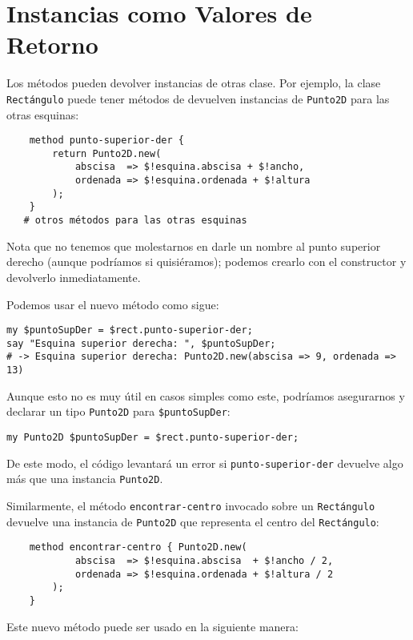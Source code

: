 \section{Instancias como Valores de Retorno}

Los métodos pueden devolver instancias de otras clase. 
Por ejemplo, la clase {\tt Rectángulo} puede tener métodos
de devuelven instancias de {\tt Punto2D} para las otras
esquinas:

\begin{verbatim}
    method punto-superior-der {
        return Punto2D.new(
            abscisa  => $!esquina.abscisa + $!ancho, 
            ordenada => $!esquina.ordenada + $!altura
        );
    }
   # otros métodos para las otras esquinas
\end{verbatim}

Nota que no tenemos que molestarnos en darle un nombre al
punto superior derecho (aunque podríamos si quisiéramos);
podemos crearlo con el constructor y devolverlo inmediatamente.

Podemos usar el nuevo método como sigue:

\begin{verbatim}
my $puntoSupDer = $rect.punto-superior-der;
say "Esquina superior derecha: ", $puntoSupDer;
# -> Esquina superior derecha: Punto2D.new(abscisa => 9, ordenada => 13)
\end{verbatim}

Aunque esto no es muy útil en casos simples como este, 
podríamos asegurarnos y declarar un tipo {\tt Punto2D}
para \verb|$puntoSupDer|:

\begin{verbatim}
my Punto2D $puntoSupDer = $rect.punto-superior-der;
\end{verbatim} 

De este modo, el código levantará un error si {\tt punto-superior-der}
devuelve algo más que una instancia {\tt Punto2D}.

Similarmente, el método \verb|encontrar-centro| invocado 
sobre un {\tt Rectángulo} devuelve una instancia de 
{\tt Punto2D} que representa el centro del {\tt Rectángulo}:

\begin{verbatim}
    method encontrar-centro { Punto2D.new(
            abscisa  => $!esquina.abscisa  + $!ancho / 2, 
            ordenada => $!esquina.ordenada + $!altura / 2
        );
    }
\end{verbatim}
%
Este nuevo método puede ser usado en la siguiente manera:

